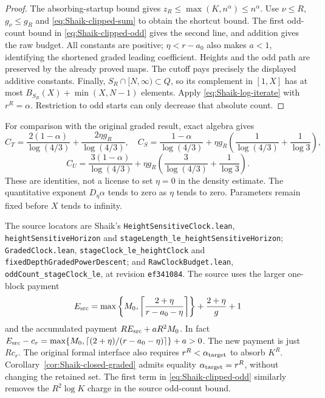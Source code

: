 \begin{proof}
The absorbing-startup bound gives
\(z_R\le\max(K,n^\alpha)\le n^\alpha\).
Use \(\nu\le R\), \(g_\nu\le g_R\) and
\eqref{eq:Shaik-clipped-sum} to obtain the shortcut bound.
The first odd-count bound in \eqref{eq:Shaik-clipped-odd} gives the
second line, and addition gives the raw budget. All constants are
positive; \(\eta<r-a_0\) also makes \(a<1\), identifying the shortened
graded leading coefficient. Heights and the odd path are preserved
by the already proved maps. The cutoff pays precisely the displayed
additive constants. Finally,
\(S_R\cap[N,\infty)\subset Q\), so its complement in \([1,X]\)
has at most \(B_{S_R}(X)+\min(X,N-1)\) elements. Apply
\eqref{eq:Shaik-log-iterate} with \(r^R=\alpha\).
Restriction to odd starts can only decrease that absolute count.
\end{proof}

For comparison with the original graded result, exact algebra gives
\[
 C_T=\frac{2(1-\alpha)}{\log(4/3)}
       +\frac{2\eta g_R}{\log(4/3)},\quad
 C_S=\frac{1-\alpha}{\log(4/3)}
       +\eta g_R\left(\frac1{\log(4/3)}+\frac1{\log3}\right),
\]
\[
 C_U=\frac{3(1-\alpha)}{\log(4/3)}
       +\eta g_R\left(\frac3{\log(4/3)}+\frac1{\log3}\right).
\]
These are identities, not a license to set \(\eta=0\) in the density
estimate. The quantitative exponent \(D_\eta\alpha\) tends to zero
as \(\eta\) tends to zero. Parameters remain fixed before \(X\)
tends to infinity.

The source locators are Shaik's \texttt{HeightSensitiveClock.lean},
\texttt{heightSensitiveHorizon} and
\texttt{stageLength\_le\_heightSensitiveHorizon};
\texttt{GradedClock.lean}, \texttt{stageClock\_le\_heightClock} and
\texttt{fixedDepthGradedPowerDescent}; and
\texttt{RawClockBudget.lean}, \texttt{oddCount\_stageClock\_le},
at revision \texttt{ef341084}.
The source uses the larger one-block payment
\[
 E_{\rm src}=
 \max\left\{M_0,\left\lceil\frac{2+\eta}{r-a_0-\eta}\right\rceil\right\}
       +\frac{2+\eta}{g}+1
\]
and the accumulated payment
\(R E_{\rm src}+aR^2M_0\). In fact
\(E_{\rm src}-c_r=
 \max\{M_0,\lceil(2+\eta)/(r-a_0-\eta)\rceil\}+a>0\).
The new payment is just \(Rc_r\). The original formal interface also
requires \(r^R<\alpha_{\rm target}\) to absorb \(K^R\).
Corollary~\ref{cor:Shaik-closed-graded} admits equality
\(\alpha_{\rm target}=r^R\), without changing the retained set.
The first term in \eqref{eq:Shaik-clipped-odd} similarly removes
the \(R^2\log K\) charge in the source odd-count bound.

